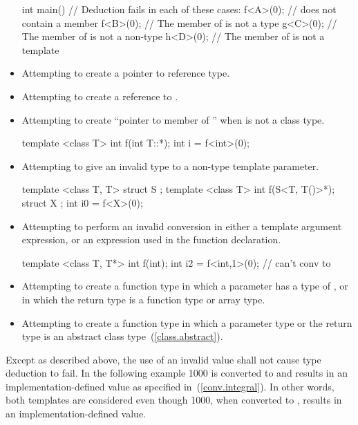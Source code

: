 \begin{itemize}
\begin{codeblock}
int main() {
  // Deduction fails in each of these cases:
  f<A>(0);  //  does not contain a member 
  f<B>(0);  // The  member of  is not a type
  g<C>(0);  // The  member of  is not a non-type
  h<D>(0);  // The  member of  is not a template
}
\end{codeblock}
\exitexample
\item
Attempting to create a pointer to reference type.
\item
Attempting to create a reference to .
\item
Attempting to create ``pointer to member of '' when  is not a
class type.
\enterexample

\begin{codeblock}
template <class T> int f(int T::*);
int i = f<int>(0);
\end{codeblock}
\exitexample
\item
Attempting to give an invalid type to a non-type template parameter.
\enterexample
\begin{codeblock}
template <class T, T> struct S {};
template <class T> int f(S<T, T()>*);
struct X {};
int i0 = f<X>(0);
\end{codeblock}
\exitexample

\item
Attempting to perform an invalid conversion in either a template
argument expression, or an expression used in the function
declaration.
\enterexample

\begin{codeblock}
template <class T, T*> int f(int);
int i2 = f<int,1>(0);           // can't conv  to 
\end{codeblock}
\exitexample

\item
Attempting to create a function type in which a parameter has a type
of , or in which the return type is a function type
or array type.

\item
Attempting to create a function type in which a parameter type or the return type is an
abstract class type~(\ref{class.abstract}).
\end{itemize}
\exitnote

\pnum
Except as described above, the use of an invalid value shall not cause
type deduction to fail.
\enterexample
In the following example 1000 is converted to  and results
in an implementation-defined value as specified in~(\ref{conv.integral}).
In other words, both templates are considered even though 1000,
when converted to , results in an implementation-defined
value.

